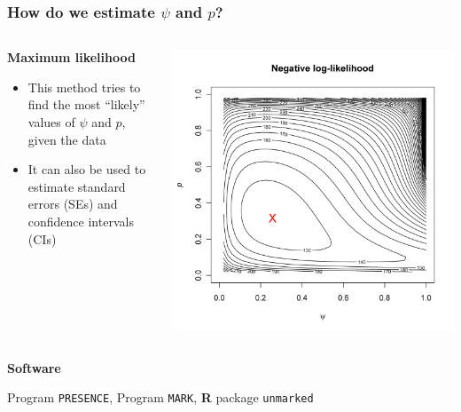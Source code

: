 \documentclass[color=usenames,dvipsnames]{beamer}\usepackage[]{graphicx}\usepackage[]{color}
\begin{document}
\begin{frame}
  \frametitle{How do we estimate $\psi$ and $p$?}
  \pause
  \begin{columns}
    \begin{column}{0.6\textwidth}
      \large {\bf Maximum likelihood \par}
      \large
      \begin{itemize}%
      \item This method tries to find the most ``likely'' values of
        $\psi$ and $p$, given the data
      \item It can also be used to estimate standard errors (SEs) and
        confidence intervals (CIs)
      \end{itemize}
    \end{column}
    \pause
    \begin{column}{0.4\textwidth}
      \includegraphics[width=\textwidth]{figs/mlePandPsi}
    \end{column}
  \end{columns}
  \pause
  {\bf Software \par}
  Program {\tt PRESENCE}, Program {\tt MARK}, {\bf R} package {\tt unmarked}
\end{frame}
\end{document}

